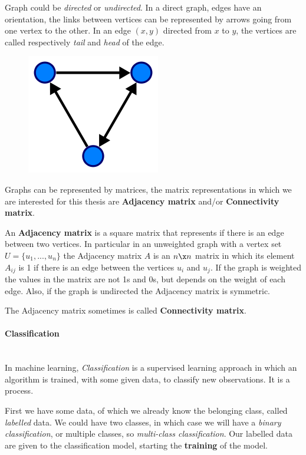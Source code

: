 Graph could be \textit{directed} or \textit{undirected}. In a direct graph, edges have an orientation, the links between vertices can be represented by arrows going from one vertex to the other. In an edge $ (x,y) $ directed from $ x $ to $ y $, the vertices are called respectively \textit{tail} and \textit{head} of the edge.
\begin{figure}[htbp]
	\centering
	\includegraphics[scale=0.5]{Immagini/220px-Directed.svg.png}
	\caption{\label{fig:diagram2}}
\end{figure}

Graphs can be represented by matrices, the matrix representations in which we are interested for this thesis are \textbf{Adjacency matrix} and/or \textbf{Connectivity matrix}. 

An \textbf{Adjacency matrix} is a square matrix that represents if there is an edge between two vertices. In particular in an unweighted graph with a vertex set $ U=\{u_{1}, ..., u_{n}\} $ the Adjacency matrix $ A $ is an $ n \x n $ matrix in which its element $ A_{ij} $ is 1 if there is an edge between the vertices $ u_{i} $ and $ u_{j} $. If the graph is weighted the values in the matrix are not 1s and 0s, but depends on the weight of each edge. Also, if the graph is undirected the Adjacency matrix is symmetric.

The Adjacency matrix sometimes is called \textbf{Connectivity matrix}.

\paragraph{Classification}\
\\
In machine learning, \emph{Classification} is a supervised learning approach in which an algorithm is trained, with some given data, to classify new observations. It is a process. 

First we have some data, of which we already know the belonging class, called \emph{labelled} data. We could have two classes, in which case we will have a \emph{binary classification}, or multiple classes, so \emph{multi-class classification}. Our labelled data are given to the classification model, starting the \textbf{training} of the model.

